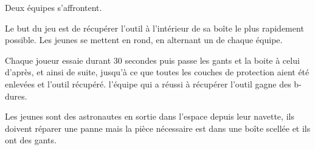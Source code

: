 \documentclass{grand-jeu}
\begin{document}
\begin{liste-materiel}
\end{liste-materiel}

\begin{regles}
Deux équipes s’affrontent.

Le but du jeu est de récupérer l’outil à l’intérieur de sa boîte le plus rapidement possible. Les jeunes se mettent en rond, en alternant un de chaque équipe.

Chaque joueur essaie durant 30 secondes puis passe les gants et la boite à celui d’après, et ainsi de suite, jusqu’à ce que toutes les couches de protection aient été enlevées et l’outil récupéré. l’équipe qui a réussi à récupérer l’outil gagne des b-dures.
\end{regles}

\begin{imaginaire}
Les jeunes sont des astronautes en sortie dans l’espace depuis leur navette, ils doivent réparer une panne mais la pièce nécessaire est dans une boîte scellée et ils ont des gants.
\end{imaginaire}

\begin{moments-stop}
\end{moments-stop}
\end{document}
